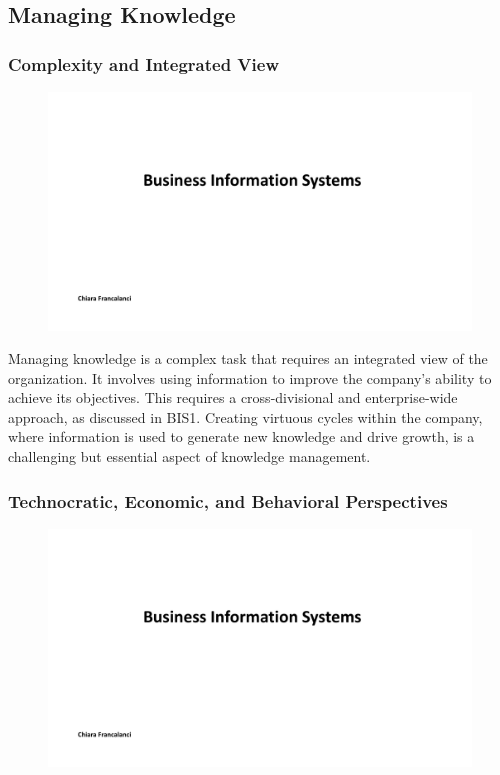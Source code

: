 \subsection{Managing Knowledge}\label{managing-knowledge}

\subsubsection{Complexity and Integrated
  View}\label{complexity-and-integrated-view}

\begin{figure}[!h]
  \centering
  \includegraphics[page=8, trim = 1.5cm 5cm 1.5cm 4.5cm, clip, width=\imagewidth]{images/05 - KM.pdf}
\end{figure}

Managing knowledge is a complex task that requires an integrated view of
the organization. It involves using information to improve the company's
ability to achieve its objectives. This requires a cross-divisional and
enterprise-wide approach, as discussed in BIS1. Creating virtuous cycles
within the company, where information is used to generate new knowledge
and drive growth, is a challenging but essential aspect of knowledge
management.

\subsubsection{Technocratic, Economic, and Behavioral
  Perspectives}\label{technocratic-economic-and-behavioral-perspectives}


\begin{figure}[!h]
  \centering
  \includegraphics[page=9, trim = 1.5cm 4.5cm 1.5cm 3.5cm, clip, width=\imagewidth]{images/05 - KM.pdf}
\end{figure}


